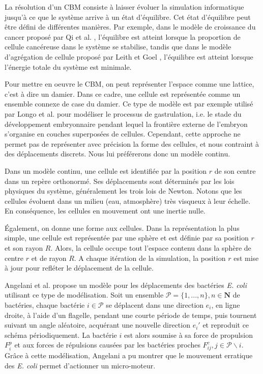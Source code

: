 \documentclass[11pt,a4paper]{article}
\begin{document}
La résolution d'un CBM consiste à laisser évoluer la simulation informatique jusqu'à ce que le système arrive à un état d'équilibre. Cet état d'équilibre peut être défini de différentes manières. Par exemple, dans le modèle de croissance du cancer proposé par Qi et al. \cite{qi1993cellular}, l'équilibre est atteint lorsque la proportion de cellule cancéreuse dans le système se stabilise, tandis que dans le modèle d'agrégation de cellule proposé par Leith et Goel \cite{leith1971simulation}, l'équilibre est atteint lorsque l'énergie totale du système est minimale.
 
Pour mettre en oeuvre le CBM, on peut représenter l'espace comme une lattice, c'est à dire un damier. Dans ce cadre, une cellule est représentée comme un ensemble connexe de case du damier. Ce type de modèle est par exemple utilisé par Longo et al. \cite{longo2004multicellular} pour modéliser le processus de gastrulation, i.e. le stade du développement embryonnaire pendant lequel la frontière externe de l'embryon s'organise en couches superposées de cellules. Cependant, cette approche ne permet pas de représenter avec précision la forme des cellules, et nous contraint à des déplacements discrets. Nous lui préférerons donc un modèle continu.

Dans un modèle continu, une cellule est identifiée par la position $r$ de son centre dans un repère orthonormé. Ses déplacements sont déterminés par les lois physiques du système, généralement les trois lois de Newton. Notons que les cellules évoluent dans un milieu (eau, atmosphère) très visqueux à leur échelle. En conséquence, les cellules en mouvement ont une inertie nulle.

Également, on donne une forme aux cellules. Dans la représentation la plus simple, une cellule est représentée par une sphère et est définie par sa position $r$ et son rayon $R$. Alors, la cellule occupe tout l'espace contenu dans la sphère de centre $r$ et de rayon $R$. A chaque itération de la simulation, la position $r$ est mise à jour pour refléter le déplacement de la cellule. 

Angelani et al. \cite{angelani2009self} propose un modèle pour les déplacements des bactéries \emph{E. coli} utilisant ce type de modélisation. Soit un ensemble $\mathcal{P} = \{1,...,n\}, n \in \mathbf{N}$ de bactéries, chaque bactérie $i \in \mathcal{P}$ se déplacent dans une direction $e_i$, en ligne droite, à l'aide d'un flagelle, pendant une courte période de temps, puis tournent suivant un angle aléatoire, acquérant une nouvelle direction $e_i'$ et reproduit ce schéma périodiquement. La bactérie $i$ est alors soumise à sa force de propulsion $F_i^p$ et aux forces de répulsions causées par les bactéries proches $F_{ij}^c, j \in \mathcal{P}\backslash i$. Grâce à cette modélisation, Angelani a pu montrer que le mouvement erratique des \emph{E. coli} permet d'actionner un micro-moteur.
\end{document}
